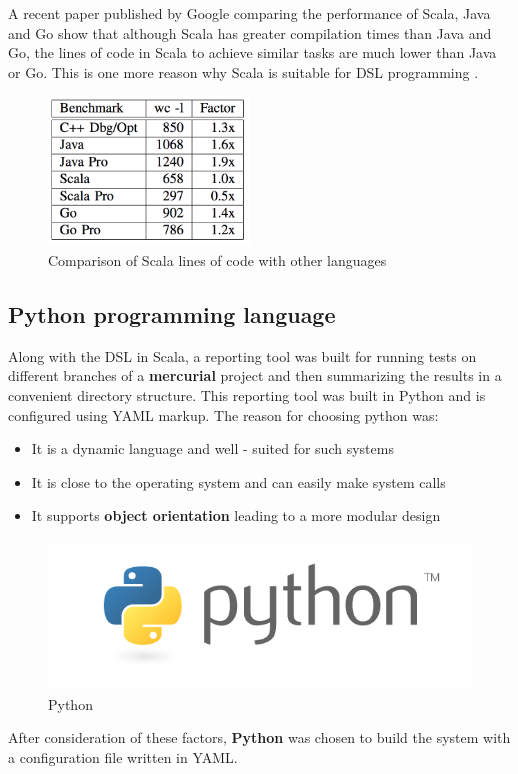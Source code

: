 \documentclass[12pt]{article}
\begin{document}
\noindent
A recent paper published by Google comparing the performance of Scala, Java and Go show that although Scala has greater compilation times than Java and Go, the lines of code in Scala to achieve similar tasks are much lower than Java or Go. This is one more reason why Scala is suitable for DSL programming \cite{performanceComparison}.

\begin{figure}[H]
  \centering
    \includegraphics[height=150px]{figures/scala_loc.png}
  \caption{Comparison of Scala lines of code with other languages}
\end{figure}

\subsection{Python programming language}
Along with the DSL in Scala, a reporting tool was built for running tests on different branches of a \textbf{mercurial} project and then summarizing the results in a convenient directory structure. This reporting tool was built in Python and is configured using YAML markup. The reason for choosing python was:
\begin{itemize}
\item It is a dynamic language and well - suited for such systems
\item It is close to the operating system and can easily make system calls
\item It supports \textbf{object orientation} leading to a more modular design \cite{python}
\end{itemize}

\begin{figure}[H]
  \centering
    \includegraphics[height=150px]{figures/python_lang.png}
  \caption{Python}
\end{figure}
After consideration of these factors, \textbf{Python} was chosen to build the system with a configuration file written in YAML.
\end{document}
